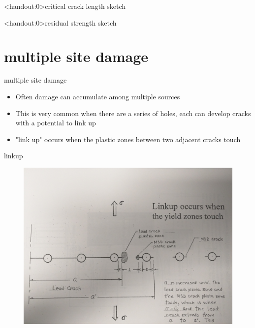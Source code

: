 \documentclass[10pt]{beamer}
\begin{document}
\begin{frame}<handout:0>{critical crack length}
	sketch
\end{frame}


\begin{frame}<handout:0>{residual strength}
	sketch
\end{frame}

\section{multiple site damage}

\begin{frame}{multiple site damage}
	\begin{itemize}[<+->]
		\item Often damage can accumulate among multiple sources
		\item This is very common when there are a series of holes, each can develop cracks with a potential to link up
		\item "link up" occurs when the plastic zones between two adjacent cracks touch
	\end{itemize}
\end{frame}

\begin{frame}{linkup}
	\begin{figure}
		\centering
		\includegraphics[width=0.7\linewidth]{msd}
		\label{fig:msd}
	\end{figure}
\end{frame}
\end{document}
